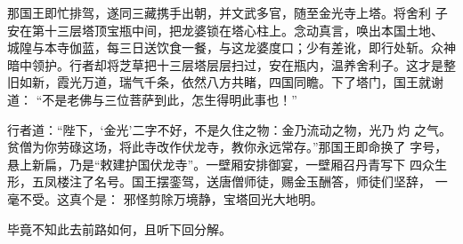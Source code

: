 那国王即忙排驾，遂同三藏携手出朝，并文武多官，随至金光寺上塔。将舍利
子安在第十三层塔顶宝瓶中间，把龙婆锁在塔心柱上。念动真言，唤出本国土地、
城隍与本寺伽蓝，每三日送饮食一餐，与这龙婆度口；少有差讹，即行处斩。众神
暗中领护。行者却将芝草把十三层塔层层扫过，安在瓶内，温养舍利子。这才是整
旧如新，霞光万道，瑞气千条，依然八方共睹，四国同瞻。下了塔门，国王就谢道：
“不是老佛与三位菩萨到此，怎生得明此事也！”

行者道：“陛下，‘金光’二字不好，不是久住之物：金乃流动之物，光乃灼
之气。贫僧为你劳碌这场，将此寺改作伏龙寺，教你永远常存。”那国王即命换了
字号，悬上新扁，乃是“敕建护国伏龙寺”。一壁厢安排御宴，一壁厢召丹青写下
四众生形，五凤楼注了名号。国王摆銮驾，送唐僧师徒，赐金玉酬答，师徒们坚辞，
一毫不受。这真个是：
邪怪剪除万境静，宝塔回光大地明。

毕竟不知此去前路如何，且听下回分解。